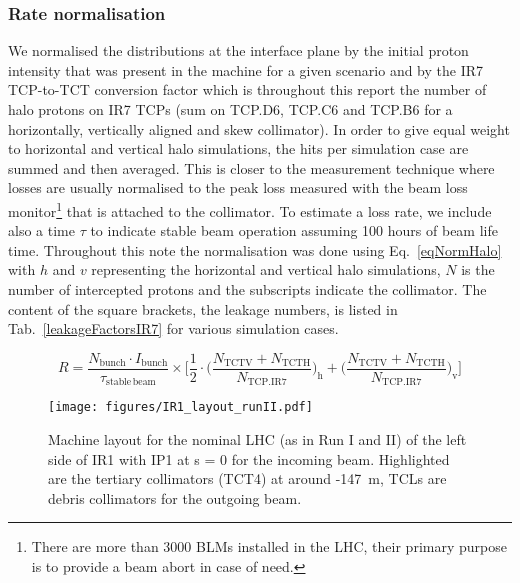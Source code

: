 \subsubsection{Rate normalisation}


We normalised the distributions at the interface plane by the initial proton intensity that was present in the machine for a given scenario and by the IR7 TCP-to-TCT conversion factor which is throughout this report the number of halo protons on IR7 TCPs (sum on TCP.D6, TCP.C6 and TCP.B6 for a horizontally, vertically aligned and skew collimator). In order to give equal weight to horizontal and vertical halo simulations, the hits per simulation case are summed and then averaged. This is closer to the measurement technique where losses are usually normalised to the peak loss measured with the beam loss monitor\footnote{There are more than 3000 BLMs installed in the LHC, their primary purpose is to provide a beam abort in case of need.} that is attached to the collimator. To estimate a loss rate, we include also a time $\tau$ to indicate stable beam operation assuming 100 hours of beam life time. Throughout this note the normalisation was done using Eq.~\ref{eqNormHalo} with $h$ and $v$ representing the horizontal and vertical halo simulations, $N$ is the number of intercepted protons and the subscripts indicate the collimator. The content of the square brackets, the leakage numbers, is listed in Tab.~\ref{leakageFactorsIR7} for various simulation cases.

\begin{equation} \label{eqNormHalo}
R = \frac{N_{\mathrm{bunch}} \cdot I_{\mathrm{bunch}}}{\tau_{\mathrm{stable \, beam}}} \times \Bigg[ \frac{1}{2} \cdot \Big( \frac{N_{\mathrm{TCTV}} + N_{\mathrm{TCTH}}}{N_{\mathrm{TCP.IR7}}}\Big)_{\mathrm{h}} + \Big( \frac{N_{\mathrm{TCTV}} + N_{\mathrm{TCTH}}}{N_{\mathrm{TCP.IR7}}} \Big)_{\mathrm{v}}  \Bigg]
\end{equation}


\begin{figure}%
\begin{center}
\texttt{[image: figures/IR1\_layout\_runII.pdf]}
\end{center}
\vspace{-0.6cm}
 \caption{Machine layout for the nominal LHC (as in Run I and II) of the left side of IR1 with IP1 at s = 0 for the incoming beam. Highlighted are the tertiary collimators (TCT4) at around -147~m, TCLs are debris collimators for the outgoing beam.
  \label{nominalLHC_layout}}
\end{figure}


